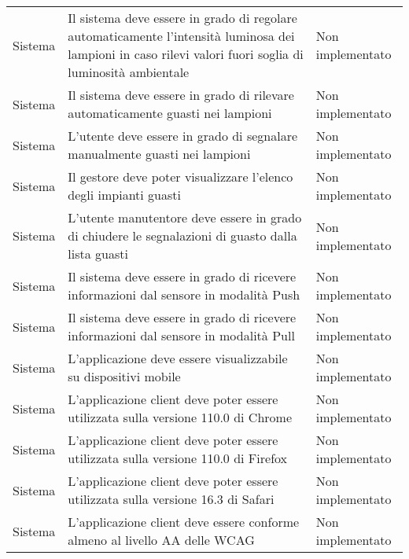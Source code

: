 \begin{center}
\begin{xltabular}{\linewidth}{|l|X|l|}
        Sistema & Il sistema deve essere in grado di regolare automaticamente l'intensità luminosa dei lampioni in caso rilevi valori fuori soglia di luminosità ambientale & Non implementato\\
        Sistema & Il sistema deve essere in grado di rilevare automaticamente guasti nei lampioni & Non implementato\\
        Sistema & L'utente deve essere in grado di segnalare manualmente guasti nei lampioni & Non implementato\\
        Sistema & Il gestore deve poter visualizzare l'elenco degli impianti guasti & Non implementato\\
        Sistema & L'utente manutentore deve essere in grado di chiudere le segnalazioni di guasto dalla lista guasti & Non implementato\\
        Sistema & Il sistema deve essere in grado di ricevere informazioni dal sensore in modalità Push & Non implementato\\
        Sistema & Il sistema deve essere in grado di ricevere informazioni dal sensore in modalità Pull & Non implementato\\
        Sistema & L'applicazione deve essere visualizzabile su dispositivi mobile & Non implementato\\
        Sistema & L'applicazione client deve poter essere utilizzata sulla versione 110.0 di Chrome  & Non implementato\\
        Sistema & L'applicazione client deve poter essere utilizzata sulla versione 110.0 di Firefox  & Non implementato\\
        Sistema & L'applicazione client deve poter essere utilizzata sulla versione 16.3 di Safari  & Non implementato\\
        Sistema & L'applicazione client deve essere conforme almeno al livello AA delle WCAG  & Non implementato\\
    
        
        \hline
    \end{xltabular}
\end{center}